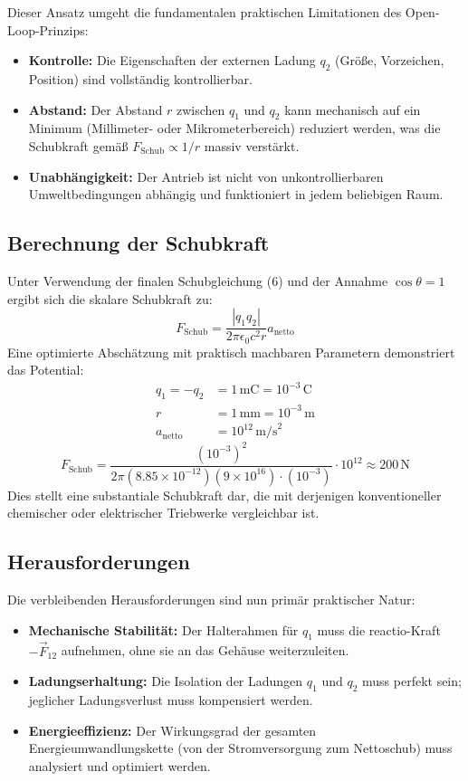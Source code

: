 \documentclass[11pt, a4paper]{article}
\begin{document}
Dieser Ansatz umgeht die fundamentalen praktischen Limitationen des Open-Loop-Prinzips:
\begin{itemize}
    \item \textbf{Kontrolle:} Die Eigenschaften der externen Ladung $q_2$ (Größe, Vorzeichen, Position) sind vollständig kontrollierbar.
    \item \textbf{Abstand:} Der Abstand $r$ zwischen $q_1$ und $q_2$ kann mechanisch auf ein Minimum (Millimeter- oder Mikrometerbereich) reduziert werden, was die Schubkraft gemäß $F_{\text{Schub}} \propto 1/r$ massiv verstärkt.
    \item \textbf{Unabhängigkeit:} Der Antrieb ist nicht von unkontrollierbaren Umweltbedingungen abhängig und funktioniert in jedem beliebigen Raum.
\end{itemize}

\subsection{Berechnung der Schubkraft}

Unter Verwendung der finalen Schubgleichung (6) und der Annahme $\cos\theta = 1$ ergibt sich die skalare Schubkraft zu:
\[
F_{\text{Schub}} = \frac{|q_1 q_2|}{2\pi\epsilon_0 c^2 r} a_{\text{netto}}
\]
Eine optimierte Abschätzung mit praktisch machbaren Parametern demonstriert das Potential:
\begin{align*}
q_1 = -q_2 &= 1\,\mathrm{mC} = 10^{-3}\,\mathrm{C} \\
r &= 1\,\mathrm{mm} = 10^{-3}\,\mathrm{m} \\
a_{\text{netto}} &= 10^{12}\,\mathrm{m/s}^2
\end{align*}
\[
F_{\text{Schub}} = \frac{(10^{-3})^2}{2\pi (8.85 \times 10^{-12}) (9 \times 10^{16}) \cdot (10^{-3})} \cdot 10^{12} \approx 200\,\mathrm{N}
\]
Dies stellt eine substantiale Schubkraft dar, die mit derjenigen konventioneller chemischer oder elektrischer Triebwerke vergleichbar ist.

\subsection{Herausforderungen}

Die verbleibenden Herausforderungen sind nun primär praktischer Natur:
\begin{itemize}
    \item \textbf{Mechanische Stabilität:} Der Halterahmen für $q_1$ muss die reactio-Kraft $-\vec{F}_{12}$ aufnehmen, ohne sie an das Gehäuse weiterzuleiten.
    \item \textbf{Ladungserhaltung:} Die Isolation der Ladungen $q_1$ und $q_2$ muss perfekt sein; jeglicher Ladungsverlust muss kompensiert werden.
    \item \textbf{Energieeffizienz:} Der Wirkungsgrad der gesamten Energieumwandlungskette (von der Stromversorgung zum Nettoschub) muss analysiert und optimiert werden.
\end{itemize}
\end{document}
